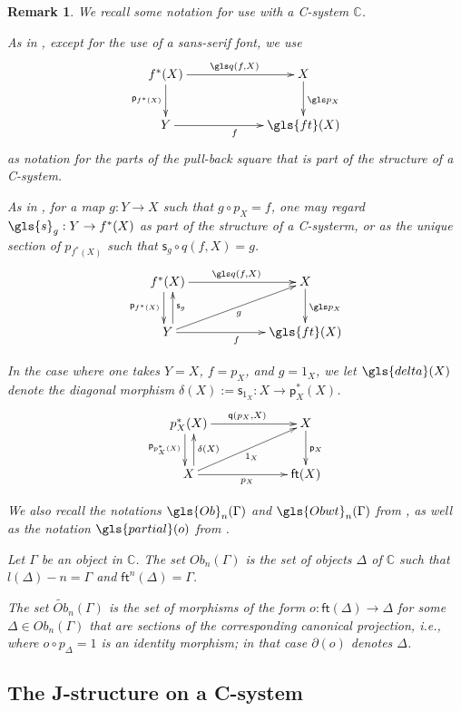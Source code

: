 \documentclass[12pt]{article}
\numberwithin{equation}{section}
\newtheorem{remark}[proposition]{Remark}
\newcommand{\sr}{\rightarrow}
\newcommand{\wt}{\widetilde}
\newcommand{\aCC}{{\mathbb C}}  %
\newcommand{\id}{1}            %
\newcommand{\ft}{\mathsf{ft}}
\newcommand{\p}{\mathsf{p}}
\newcommand{\q}{\mathsf{q}}
\newcommand{\s}{\mathsf{s}}     %
\newcommand{\Ob}{Ob}
\newcommand{\Obwt}{\wt{Ob}}
\begin{document}
\begin{remark}
  We recall some notation for use with a C-system $\aCC$.

  As in \cite[Def.~2.1 and Prop.~2.4]{Csubsystems}, except for the use of a sans-serif font, we use
  $$
    \xymatrix@C=5pc{
      f^*(X) \ar[r]^{\gls q(f,X)} \ar[d]_{\p_{f^*(X)}}  & X \ar[d]^{\gls p_X} \\
      Y \ar[r]_f & \gls{ft}(X)
    }
  $$
  as notation for the parts of the pull-back square that is part of the
  structure of a C-system.

  As in \cite[Def.~2.3 and Prop.~2.4]{Csubsystems}, for a map $g : Y \sr X$
  such that $g \circ p_X = f$, one may regard
  $\gls{s}_g : Y \sr f^*(X)$ as part of the structure of a C-systerm, or
  as the unique section of $p_{f^*(X)}$ such that $\s_g \circ q(f,X) = g$.
  $$
    \xymatrix@C=5pc{
      f^*(X) \ar[r]^{\gls q(f,X)} \ar@<-3pt>[d]_{\p_{f^*(X)}} & X \ar[d]^{\gls p_X} \\
      Y \ar[ru]_g \ar[r]_f \ar@<-4pt>[u]_{\s_g} & \gls{ft}(X)
    }
  $$

  In the case where one takes $Y=X$, $f=p_X$, and $g = 1_X$, we let $\gls{delta}(X)$ denote
  the diagonal morphism $\delta(X) := \s_{\id_X} : X\sr \p_X^*(X)$.
  $$
    \xymatrix@C=5pc{
      p_X^*(X) \ar[r]^{\q(p_X,X)} \ar@<-3pt>[d]_{\p_{p_X^*(X)}} & X \ar[d]^{\p_X} \\
      X \ar[ru]_{1_X} \ar[r]_{p_X} \ar@<-4pt>[u]_{\delta(X)} & \ft(X)
    }
  $$

  We also recall the notations ${\gls{Ob}}_n(\Gamma)$ and
  $\gls{Obwt}_n(\Gamma)$ from \cite[\S 3]{fromunivwithPiI}, as well as the
  notation $\gls{partial}(o)$ from \cite[\S 3]{Csubsystems}.

  Let $\Gamma$ be an object in $\aCC$.  The set $\Ob_n(\Gamma)$ is the set of
  objects $\Delta$ of $\aCC$ such that $l(\Delta)-n = \Gamma$ and
  $\ft^n(\Delta) = \Gamma$.

  The set $\Obwt_n(\Gamma)$ is the set of morphisms of the form $o :
  \ft(\Delta) \sr \Delta$ for some $\Delta \in \Ob_n(\Gamma)$ that are sections
  of the corresponding canonical projection, i.e., where $o \circ p_\Delta = \id$
  is an identity morphism; in that case $\partial(o)$ denotes $\Delta$.
\end{remark}

\subsection{The J-structure on a C-system}
%
\end{document}
